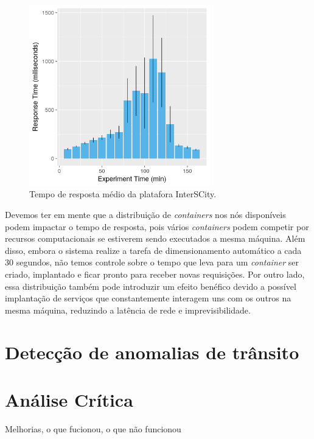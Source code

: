 \begin{figure}[ht]
	\centering
	\includegraphics[width=0.7\textwidth]{figuras/response_time_mean.png}
    \caption{Tempo de resposta médio da platafora InterSCity.}
	\label{fig:responsetime}
\end{figure}


Devemos ter em mente que a distribuição de \textit{containers} nos nós disponíveis podem impactar o tempo de resposta, pois vários \textit{containers} podem competir por recursos computacionais se estiverem
sendo executados a mesma máquina.
Além disso, embora o sistema realize a tarefa de dimensionamento automático a cada 30 segundos, não temos controle sobre o tempo que leva para um \textit{container} ser criado, implantado e ficar pronto
para receber novas requisições.
Por outro lado, essa distribuição também pode introduzir um efeito benéfico devido a possível implantação de serviços que constantemente interagem uns com os outros na mesma máquina, reduzindo a latência
de rede e imprevisibilidade.

\section{Detecção de anomalias de trânsito}
\section{Análise Crítica}

Melhorias, o que fucionou, o que não funcionou
